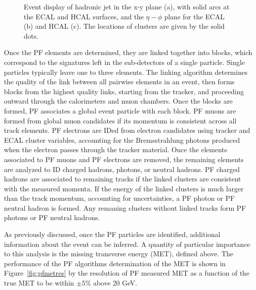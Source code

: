 \begin{figure}[tbh]
\begin{subfigure}{0.45\textwidth}
\caption{}
\end{subfigure}
\caption{Event display of hadronic jet in the x-y plane (a), with solid arcs at the ECAL and HCAL surfaces, and the $\eta-\phi$ plane for the ECAL (b) and HCAL (c). The locations of clusters are given by the solid dots.}
\label{fig:pf}
\end{figure}

\indent Once the PF elements are determined, they are linked together into blocks, which correspond to the signatures left in the sub-detectors of a single particle. Single particles typically leave one to three elements. The linking algorithm determines the quality of the link between all pairwise elements in an event, then forms blocks from the highest quality links, starting from the tracker, and proceeding outward through the calorimeters and muon chambers. Once the blocks are formed, PF associates a global event particle with each block. PF muons are formed from global muon candidates if its momentum is consistent across all track elements. PF electrons are IDed from electron candidates using tracker and ECAL cluster variables, accounting for the Bremsstrahlung photons produced when the electron passes through the tracker material. Once the elements associated to PF muons and PF electrons are removed, the remaining elements are analyzed to ID charged hadrons, photons, or neutral hadrons. PF charged hadrons are associated to remaining tracks if the linked clusters are consistent with the measured momenta. If the energy of the linked clusters is much larger than the track momentum, accounting for uncertainties, a PF photon or PF neutral hadron is formed. Any remaning clusters without linked tracks form PF photons or PF neutral hadrons. 

\indent As previously discussed, once the PF particles are identified, additional information about the event can be inferred. A quantity of particular importance to this analysis is the missing transverse energy (MET), defined above. The performance of the PF algorithms determination of the MET is shown in Figure~\ref{fig:pfmetres} by the resolution of PF measured MET as a function of the true MET to be within $\pm5\%$ above 20 GeV.


